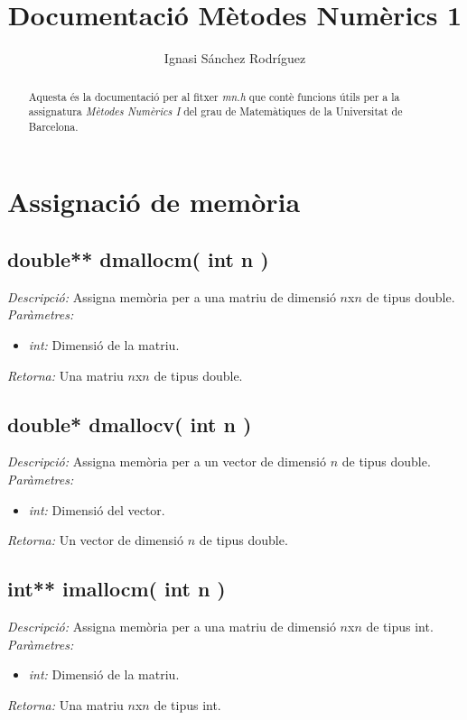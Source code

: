\documentclass[a4paper,10pt, notitlepage]{article}
\title{Documentació Mètodes Numèrics 1}
\author{Ignasi Sánchez Rodríguez}
\begin{document}
\begin{titlepage}
 

\maketitle

\begin{abstract}
Aquesta és la documentació per al fitxer \textit{mn.h} que contè funcions útils per a la assignatura \textit{Mètodes Numèrics I} del grau de Matemàtiques de la Universitat de Barcelona.
\end{abstract}

\end{titlepage}

\tableofcontents

\newpage

\section{Assignació de memòria}
\subsection{double** dmallocm( int n )}
\textit{Descripció: }
  Assigna memòria per a una matriu de dimensió $n$x$n$ de tipus double.
\\\textit{Paràmetres: }\begin{itemize}[label={--}]
  \item \textit{int: } Dimensió de la matriu.
\end{itemize}
\textit{Retorna: } Una matriu $n$x$n$ de tipus double.



\subsection{double* dmallocv( int n )}
\textit{Descripció: }
  Assigna memòria per a un vector de dimensió $n$ de tipus double.
\\\textit{Paràmetres: }\begin{itemize}[label={--}]
  \item \textit{int: } Dimensió del vector.
\end{itemize}
\textit{Retorna: } Un vector de dimensió $n$ de tipus double.
 
 
 
\subsection{int** imallocm( int n )}
\textit{Descripció: }
  Assigna memòria per a una matriu de dimensió $n$x$n$ de tipus int.
\\\textit{Paràmetres: }\begin{itemize}[label={--}]
  \item \textit{int: } Dimensió de la matriu.
\end{itemize}
\textit{Retorna: } Una matriu $n$x$n$ de tipus int.
\end{document}
